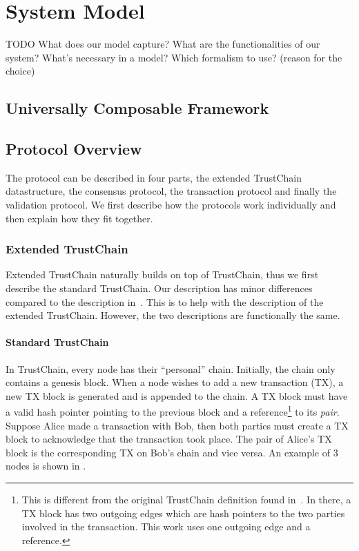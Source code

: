 \chapter{System Model}
\label{ch:model}

TODO
What does our model capture?
What are the functionalities of our system?
What's necessary in a model?
Which formalism to use? (reason for the choice)

\section{Universally Composable Framework}

\section{Protocol Overview}
The protocol can be described in four parts, the extended TrustChain datastructure, 
the consensus protocol, the transaction protocol and finally the validation protocol.
We first describe how the protocols work individually and then explain how they fit together.

\subsection{Extended TrustChain}
Extended TrustChain naturally builds on top of TrustChain, thus we first describe the standard TrustChain.
Our description has minor differences compared to the description in~\cite{trustchain}.
This is to help with the description of the extended TrustChain.
However, the two descriptions are functionally the same.

\subsubsection*{Standard TrustChain}
In TrustChain, every node has their ``personal'' chain. 
Initially, the chain only contains a genesis block.
When a node wishes to add a new transaction (TX), a new TX block is generated and is appended to the chain.
A TX block must have a valid hash pointer pointing to the previous block
and a reference\footnote{This is different from the original TrustChain definition found in~\cite{trustchain}.
In there, a TX block has two outgoing edges which are hash pointers to the two parties involved in the transaction.
This work uses one outgoing edge and a reference.} to its \emph{pair}.
Suppose Alice made a transaction with Bob, then both parties must create a TX block to acknowledge that the transaction took place.
The pair of Alice's TX block is the corresponding TX on Bob's chain and vice versa.
An example of 3 nodes is shown in .

